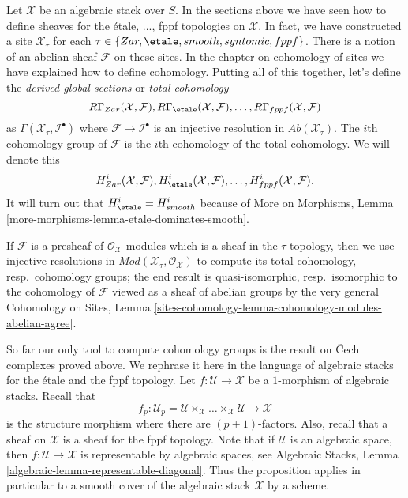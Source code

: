 \noindent
Let $\mathcal{X}$ be an algebraic stack over $S$. In the sections above
we have seen how to define sheaves for the \'etale, ..., fppf
topologies on $\mathcal{X}$. In fact, we have constructed a site
$\mathcal{X}_\tau$ for each $\tau \in \{Zar, \etale, smooth, syntomic,
fppf\}$. There is a notion of an abelian sheaf $\mathcal{F}$ on these sites.
In the chapter on cohomology of sites we have explained how to define
cohomology. Putting all of this together, let's define the
{\it derived global sections} or {\it total cohomology}
$$
R\Gamma_{Zar}(\mathcal{X}, \mathcal{F}),
R\Gamma_\etale(\mathcal{X}, \mathcal{F}), \ldots,
R\Gamma_{fppf}(\mathcal{X}, \mathcal{F})
$$
as $\Gamma(\mathcal{X}_\tau, \mathcal{I}^\bullet)$ where
$\mathcal{F} \to \mathcal{I}^\bullet$ is an injective resolution
in $\textit{Ab}(\mathcal{X}_\tau)$. The $i$th cohomology group of $\mathcal{F}$
is the $i$th cohomology of the total cohomology. We will denote
this
$$
H^i_{Zar}(\mathcal{X}, \mathcal{F}),
H^i_\etale(\mathcal{X}, \mathcal{F}), \ldots,
H^i_{fppf}(\mathcal{X}, \mathcal{F}).
$$
It will turn out that $H^i_\etale = H^i_{smooth}$ because of
More on Morphisms, Lemma \ref{more-morphisms-lemma-etale-dominates-smooth}.

\medskip\noindent
If $\mathcal{F}$ is a presheaf of $\mathcal{O}_\mathcal{X}$-modules
which is a sheaf in the $\tau$-topology, then we use injective
resolutions in $\textit{Mod}(\mathcal{X}_\tau, \mathcal{O}_\mathcal{X})$
to compute its total cohomology, resp.\ cohomology groups;
the end result is quasi-isomorphic, resp.\ isomorphic to the cohomology
of $\mathcal{F}$ viewed as a sheaf of abelian groups by the very general
Cohomology on Sites, Lemma
\ref{sites-cohomology-lemma-cohomology-modules-abelian-agree}.

\medskip\noindent
So far our only tool to compute cohomology groups is the result on
{\v C}ech complexes proved above. We rephrase it here in the language
of algebraic stacks for the \'etale and the fppf topology. Let
$f : \mathcal{U} \to \mathcal{X}$ be a $1$-morphism of algebraic stacks.
Recall that
$$
f_p : \mathcal{U}_p =
\mathcal{U} \times_\mathcal{X} \ldots \times_\mathcal{X} \mathcal{U}
\longrightarrow
\mathcal{X}
$$
is the structure morphism where there are $(p + 1)$-factors. Also, recall
that a sheaf on $\mathcal{X}$ is a sheaf for the fppf topology. Note
that if $\mathcal{U}$ is an algebraic space, then
$f : \mathcal{U} \to \mathcal{X}$ is representable by algebraic spaces,
see
Algebraic Stacks, Lemma \ref{algebraic-lemma-representable-diagonal}.
Thus the proposition applies in particular to a smooth cover of the
algebraic stack $\mathcal{X}$ by a scheme.

